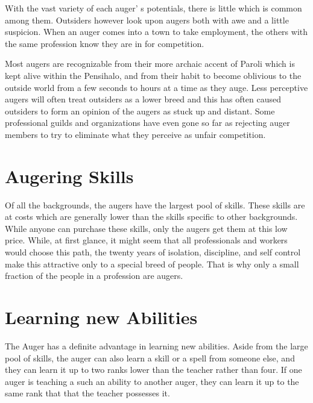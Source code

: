 With the vast variety of each auger' s potentials, there is little which is common among them. Outsiders however look upon augers both with awe and a little suspicion. When an auger comes into a town to take employment, the others with the same profession know they are in for competition.

Most augers are recognizable from their more archaic accent of Paroli which is kept alive within the  Pensihalo, and from their habit to become oblivious to the outside world from a few seconds to hours at a time as they auge. Less perceptive augers will often treat outsiders as a lower breed and this has often caused outsiders to form an opinion of the augers as stuck up and distant. Some professional guilds and organizations have even gone so far as rejecting auger members to try to eliminate what they perceive as unfair competition.

\section{Augering Skills}

Of all the backgrounds, the augers have the largest pool of skills. These skills are at costs which are generally lower than the skills specific to other backgrounds. While anyone can purchase these skills, only the augers get them at this low price. While, at first glance, it might seem that all professionals and workers would choose this path, the twenty years of isolation, discipline, and self control make this attractive only to a special breed of people. That is why only a small fraction of the people in a profession are augers.

\section{Learning new Abilities}

The Auger has a definite advantage in learning new abilities. Aside from the large pool of skills, the auger can also learn a skill or a spell from someone else, and they can learn it up to two ranks lower than the teacher rather than four. If one auger is teaching a such an ability to another auger, they can learn it up to the same rank that that the teacher possesses it.

